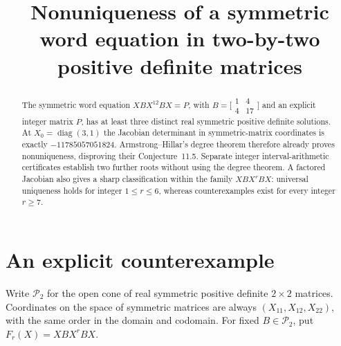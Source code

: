 \documentclass[11pt]{article}
\title{Nonuniqueness of a symmetric word equation in two-by-two positive definite matrices}
\author{}
\date{}
\newcommand{\SPD}{\mathcal P_2}
\newcommand{\diag}{\operatorname{diag}}
\begin{document}
\maketitle
\begin{abstract}
The symmetric word equation $XBX^{12}BX=P$, with
$B=\bigl[\begin{smallmatrix}1&4\\4&17\end{smallmatrix}\bigr]$ and an explicit integer matrix $P$, has at least three distinct real symmetric positive definite solutions. At $X_0=\diag(3,1)$ the Jacobian determinant in symmetric-matrix coordinates is exactly $-11785057051824$. Armstrong--Hillar's degree theorem therefore already proves nonuniqueness, disproving their Conjecture~11.5. Separate integer interval-arithmetic certificates establish two further roots without using the degree theorem. A factored Jacobian also gives a sharp classification within the family $XBX^rBX$: universal uniqueness holds for integer $1\le r\le6$, whereas counterexamples exist for every integer $r\ge7$.
\end{abstract}

\section{An explicit counterexample}
Write $\SPD$ for the open cone of real symmetric positive definite $2\times2$ matrices. Coordinates on the space of symmetric matrices are always $(X_{11},X_{12},X_{22})$, with the same order in the domain and codomain. For fixed $B\in\SPD$, put $F_r(X)=XBX^rBX$.
\end{document}
